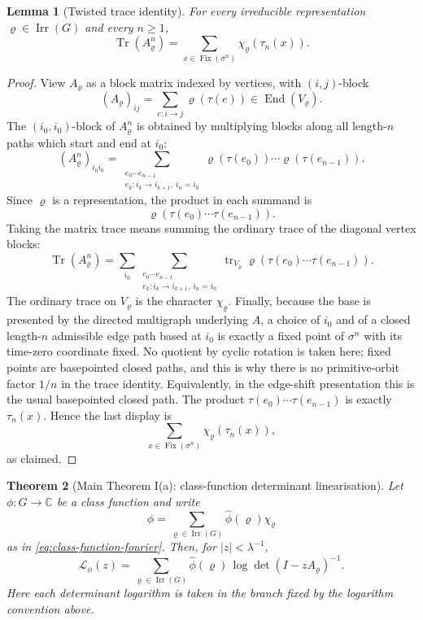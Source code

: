 \documentclass[11pt,a4paper]{amsart}
\theoremstyle{plain}
\newtheorem{theorem}{Theorem}[section]
\newtheorem{lemma}[theorem]{Lemma}
\theoremstyle{definition}
\theoremstyle{remark}
\DeclareMathOperator{\Tr}{Tr}
\DeclareMathOperator{\Irr}{Irr}
\DeclareMathOperator{\End}{End}
\newcommand{\CC}{\mathbb{C}}
\begin{document}
\begin{lemma}[Twisted trace identity]
  \label{lem:twisted-trace-identity}
  For every irreducible representation \(\varrho\in\Irr(G)\) and every
  \(n\ge 1\),
  \[
    \Tr(A_\varrho^n)
    =
    \sum_{x\in\operatorname{Fix}(\sigma^n)}
      \chi_\varrho(\tau_n(x)).
  \]
\end{lemma}

\begin{proof}
  View \(A_\varrho\) as a block matrix indexed by vertices, with
  \((i,j)\)-block
  \[
    (A_\varrho)_{ij}=\sum_{e:i\to j}\varrho(\tau(e))
    \in\End(V_\varrho).
  \]
  The \((i_0,i_0)\)-block of \(A_\varrho^n\) is obtained by multiplying
  blocks along all length-\(n\) paths which start and end at \(i_0\):
  \[
    (A_\varrho^n)_{i_0i_0}
    =
    \sum_{\substack{e_0\cdots e_{n-1}\\
          e_k:i_k\to i_{k+1},\ i_n=i_0}}
      \varrho(\tau(e_0))\cdots\varrho(\tau(e_{n-1})).
  \]
  Since \(\varrho\) is a representation, the product in each summand is
  \[
    \varrho(\tau(e_0)\cdots\tau(e_{n-1})).
  \]
  Taking the matrix trace means summing the ordinary trace of the
  diagonal vertex blocks:
  \[
    \Tr(A_\varrho^n)
    =
    \sum_{i_0}
    \sum_{\substack{e_0\cdots e_{n-1}\\
          e_k:i_k\to i_{k+1},\ i_n=i_0}}
      \operatorname{tr}_{V_\varrho}
      \varrho(\tau(e_0)\cdots\tau(e_{n-1})).
  \]
  The ordinary trace on \(V_\varrho\) is the character
  \(\chi_\varrho\). Finally, because the base is presented by the
  directed multigraph underlying \(A\), a choice of \(i_0\) and of a closed
  length-\(n\) admissible edge path based at \(i_0\) is exactly a
  fixed point of \(\sigma^n\) with its time-zero coordinate fixed. No
  quotient by cyclic rotation is taken here; fixed points are
  basepointed closed paths, and this is why there is no primitive-orbit
  factor \(1/n\) in the trace identity. Equivalently, in the edge-shift
  presentation this is the usual basepointed closed path. The product
  \(\tau(e_0)\cdots\tau(e_{n-1})\) is exactly \(\tau_n(x)\). Hence the
  last display is
  \[
    \sum_{x\in\operatorname{Fix}(\sigma^n)}
      \chi_\varrho(\tau_n(x)),
  \]
  as claimed.
\end{proof}

\begin{theorem}[Main Theorem I(a): class-function determinant
  linearisation]
  \label{thm:class-function-linearisation}
  Let \(\phi:G\to\CC\) be a class function and write
  \[
    \phi=\sum_{\varrho\in\Irr(G)}\widehat\phi(\varrho)\chi_\varrho
  \]
  as in \eqref{eq:class-function-fourier}. Then, for \(|z|<\lambda^{-1}\),
  \begin{equation}\label{eq:class-logarithm-determinant-linearisation}
    \mathcal L_\phi(z)
    =
    \sum_{\varrho\in\Irr(G)}
      \widehat\phi(\varrho)\,
      \log\det(I-zA_\varrho)^{-1}.
  \end{equation}
  Here each determinant logarithm is taken in the branch fixed by the
  logarithm convention above.
\end{theorem}
\end{document}
